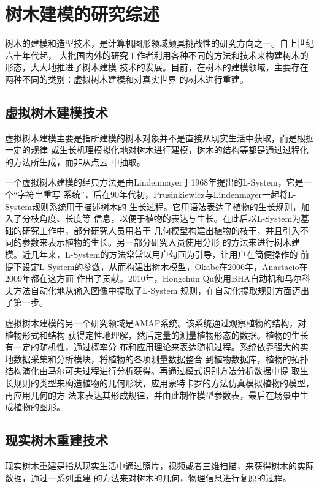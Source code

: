 



\chapter{树木建模的研究综述}
\label{cha:methodsandtechniques}

树木的建模和造型技术，是计算机图形领域颇具挑战性的研究方向之一。自上世纪六十年代起，
大批国内外的研究工作者利用各种不同的方法和技术来构建树木的形态，大大地推进了树木建模
技术的发展。目前，在树木的建模领域，主要存在两种不同的类别：虚拟树木建模和对真实世界
的树木进行重建。

\section{虚拟树木建模技术}
虚拟树木建模主要是指所建模的树木对象并不是直接从现实生活中获取，而是根据一定的规律
或生长机理模拟化地对树木进行建模，树木的结构等都是通过过程化的方法所生成，而非从点云
中抽取。

一个虚拟树木建模的经典方法是由Lindenmayer于1968年提出的L-System\cite{lsystem}，它是一个“字符串重写
系统”，后在90年代初，Prusinkiewicz与Lindenmayer一起将L-System规则系统用于描述树木的
生长过程\cite{beauty,devmodels}。它用语法表达了植物的生长规则，加入了分枝角度、长度等
信息，以便于植物的表达与生长。在此后以L-System为基础的研究工作中，部分研究人员用若干
几何模型构建出植物的枝干，并且引入不同的参数来表示植物的生长。另一部分研究人员使用分形
的方法来进行树木建模。近几年来，L-System的方法常常以用户勾画为引导，让用户在简便操作的
前提下设定L-System的参数，从而构建出树木模型，Okabe在2006年，Anastacio在2009年\cite{sketch}都在这方面
作出了贡献。2010年，Hongchun Qu使用BHA自动机和马尔科夫方法自动化地从输入图像中提取了L-System
规则，在自动化提取规则方面迈出了第一步。

虚拟树木建模的另一个研究领域是AMAP系统\cite{amap}。该系统通过观察植物的结构，对植物形式和结构
获得定性地理解，然后定量的测量植物形态的数据。植物的生长有一定的随机性，通过概率分
布和应用理论来表达随机过程。系统依靠强大的实地数据采集和分析模块，将植物的各项测量数据整合
到植物数据库，植物的拓扑结构演化由马尔可夫过程进行分析获得。再通过模式识别方法分析数据中提
取生长规则的类型来构造植物的几何形状，应用蒙特卡罗的方法仿真模拟植物的模型，再应用几何的方
法来表达其形成规律，并由此制作模型参数表，最后在场景中生成植物的图形。

\section{现实树木重建技术}
现实树木重建是指从现实生活中通过照片，视频或者三维扫描，来获得树木的实际数据，通过一系列重建
的方法来对树木的几何，物理信息进行复原的过程。

